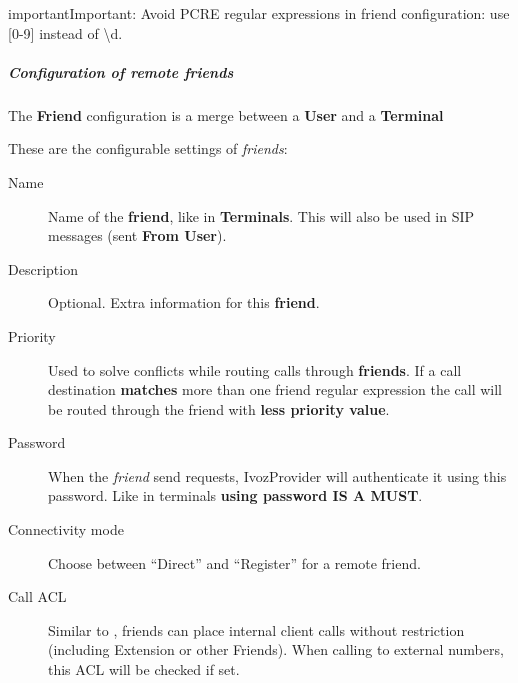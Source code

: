 \documentclass[letterpaper,10pt,english]{sphinxmanual}
\begin{document}
\begin{notice}{important}{Important:}
Avoid PCRE regular expressions in friend configuration: use {[}0-9{]} instead of \textbackslash{}d.
\end{notice}


\subparagraph{Configuration of remote friends}
\label{administration_portal/client/vpbx/routing_endpoints/friends/remote_friends:configuration-of-remote-friends}
The \textbf{Friend} configuration is a merge between a \textbf{User} and a \textbf{Terminal}

These are the configurable settings of \emph{friends}:
\begin{description}
\item[{Name}] \leavevmode{}\label{administration_portal/client/vpbx/routing_endpoints/friends/remote_friends:term-name}
Name of the \textbf{friend}, like in \textbf{Terminals}. This will also be used
in SIP messages (sent \textbf{From User}).

\item[{Description}] \leavevmode{}\label{administration_portal/client/vpbx/routing_endpoints/friends/remote_friends:term-description}
Optional. Extra information for this \textbf{friend}.

\item[{Priority}] \leavevmode{}\label{administration_portal/client/vpbx/routing_endpoints/friends/remote_friends:term-priority}
Used to solve conflicts while routing calls through \textbf{friends}.
If a call destination \textbf{matches} more than one friend regular expression
the call will be routed through the friend with \textbf{less priority value}.

\item[{Password}] \leavevmode{}\label{administration_portal/client/vpbx/routing_endpoints/friends/remote_friends:term-password}
When the \emph{friend} send requests, IvozProvider will authenticate it using
this password. Like in terminals \textbf{using password IS A MUST}.

\item[{Connectivity mode}] \leavevmode{}\label{administration_portal/client/vpbx/routing_endpoints/friends/remote_friends:term-connectivity-mode}
Choose between ``Direct'' and ``Register'' for a remote friend.

\item[{Call ACL}] \leavevmode{}\label{administration_portal/client/vpbx/routing_endpoints/friends/remote_friends:term-call-acl}
Similar to {\hyperref[administration_portal/client/vpbx/users:users]{}}, friends can place internal
client calls without restriction (including Extension or other Friends).
When calling to external numbers, this ACL will be checked if set.


\end{description}
\end{document}
